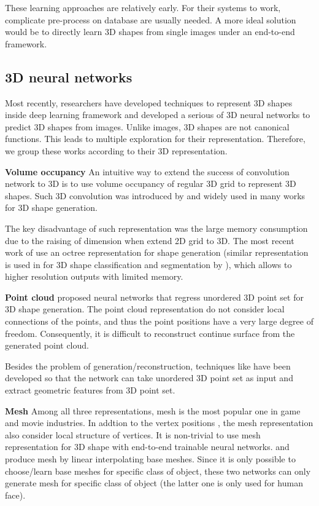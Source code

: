 These learning approaches are relatively early. For their systems to work, complicate pre-process on database are usually needed. A more ideal solution would be to directly learn 3D shapes
from single images under an end-to-end framework. 

\subsection{3D neural networks}
Most recently, researchers have developed techniques to represent 3D shapes inside deep learning framework and developed a serious of 3D neural networks to predict 3D shapes from images. Unlike images, 3D shapes are not canonical functions. This leads to multiple exploration for their representation. Therefore, we group these works according to their 3D representation.

\noindent\textbf{Volume occupancy}
An intuitive way to extend the success of convolution network to 3D is to use volume occupancy of regular 3D grid to represent 3D shapes. Such 3D convolution was introduced by \cite{3dshapenet} and widely used in many works \cite{3DR2N2,learnobj} for 3D shape generation.

The key disadvantage of such representation was the large memory consumption due to the raising of dimension when extend 2D grid to 3D. The most recent work of \cite{octreegen} use
an octree representation for shape generation (similar representation is used in for 3D shape classification and segmentation by \cite{ocnn}), which allows to higher resolution outputs
with limited memory.

\noindent\textbf{Point cloud}
\cite{PSGN} proposed neural networks that regress unordered
3D point set for 3D shape generation. The point cloud representation
do not consider local connections of the points, and thus the point positions have
a very large degree of freedom. Consequently, it is difficult to reconstruct continue surface from the generated point cloud.

Besides the problem of generation/reconstruction, techniques like \cite{PointNet,NIPS2017_7095,pointcnn} have been developed so that the network can take unordered 3D point set as input and extract geometric features from 3D point set.

\noindent\textbf{Mesh}
Among all three representations, mesh is the most popular one in game and movie industries. In addtion to the vertex positions , the mesh representation also consider local structure of vertices. It is non-trivial to use mesh representation for 3D shape with end-to-end trainable neural networks. \cite{img2mesh} and \cite{endface} produce mesh by linear interpolating base meshes. Since it is only possible to choose/learn base meshes for specific class of object, these two networks can only generate mesh for specific class of object (the latter one is only used for human face).

